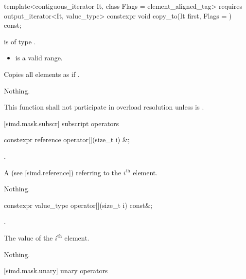 \begin{itemdecl}
template<contiguous_iterator It, class Flags = element_aligned_tag>
  requires output_iterator<It, value_type>
  constexpr void copy_to(It first, Flags = {}) const;
\end{itemdecl}

\begin{itemdescr}
  \pnum\constraints
   is of type .

  \pnum\requires
  \begin{itemize}
    \item \tcode{[mem, mem + size())} is a valid range.
  \end{itemize}

  \pnum\effects
  Copies all  elements as if  \foralli.

  \pnum\throws Nothing.

  \pnum\remarks
  This function shall not participate in overload resolution unless  is .
\end{itemdescr}

[simd.mask.subscr]{\texorpdfstring{ subscript}{simd_mask subscript} operators}

\begin{itemdecl}
constexpr reference operator[](size_t i) &;
\end{itemdecl}

\begin{itemdescr}
  \pnum\requires
  .

  \pnum\returns
  A  (see \ref{simd.reference}) referring to the $i^\text{th}$ element.

  \pnum\throws Nothing.
\end{itemdescr}

\begin{itemdecl}
constexpr value_type operator[](size_t i) const&;
\end{itemdecl}

\begin{itemdescr}
  \pnum\requires
  .

  \pnum\returns
  The value of the $i^\text{th}$ element.

  \pnum\throws Nothing.
\end{itemdescr}

[simd.mask.unary]{\texorpdfstring{ unary}{simd_mask unary} operators}

